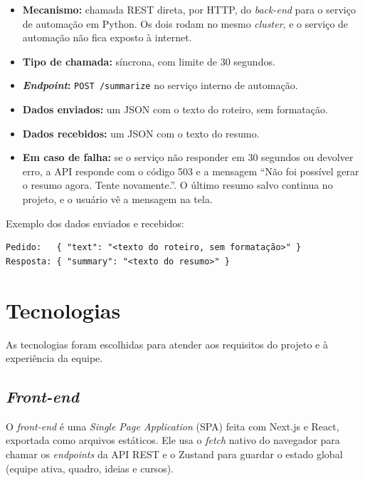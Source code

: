 \begin{itemize}
    \item \textbf{Mecanismo:} chamada REST direta, por HTTP, do \textit{back-end} para o serviço de automação em Python. Os dois rodam no mesmo \textit{cluster}, e o serviço de automação não fica exposto à internet.
    \item \textbf{Tipo de chamada:} síncrona, com limite de 30 segundos.
    \item \textbf{\textit{Endpoint}:} \verb|POST /summarize| no serviço interno de automação.
    \item \textbf{Dados enviados:} um JSON com o texto do roteiro, sem formatação.
    \item \textbf{Dados recebidos:} um JSON com o texto do resumo.
    \item \textbf{Em caso de falha:} se o serviço não responder em 30 segundos ou devolver erro, a API responde com o código 503 e a mensagem ``Não foi possível gerar o resumo agora. Tente novamente.''. O último resumo salvo continua no projeto, e o usuário vê a mensagem na tela.
\end{itemize}

Exemplo dos dados enviados e recebidos:

\begin{small}
\begin{verbatim}
Pedido:   { "text": "<texto do roteiro, sem formatação>" }
Resposta: { "summary": "<texto do resumo>" }
\end{verbatim}
\end{small}

\section{Tecnologias}

As tecnologias foram escolhidas para atender aos requisitos do projeto e à experiência da equipe.

\subsection{\textit{Front-end}}

O \textit{front-end} é uma \textit{Single Page Application} (SPA) feita com Next.js e React, exportada como arquivos estáticos. Ele usa o \textit{fetch} nativo do navegador para chamar os \textit{endpoints} da API REST e o Zustand para guardar o estado global (equipe ativa, quadro, ideias e cursos).

